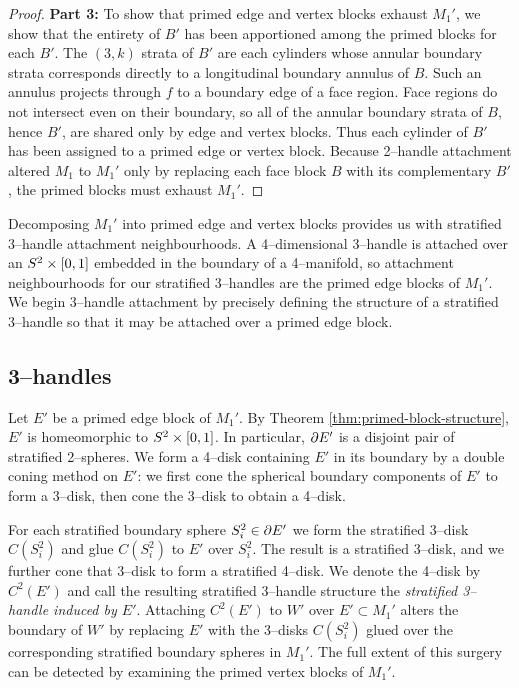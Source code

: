 \begin{proof}
	\textbf{Part 3:}
	To show that primed edge and vertex blocks exhaust $M_1'$, we show that the entirety of $B'$ has been apportioned among the primed blocks for each $B'$.
	The $(3,k)$ strata of $B'$ are each cylinders whose annular boundary strata corresponds directly to a longitudinal boundary annulus of $B$.
	Such an annulus projects through $f$ to a boundary edge of a face region.
	Face regions do not intersect even on their boundary, so all of the annular boundary strata of $B$, hence $B'$, are shared only by edge and vertex blocks.
	Thus each cylinder of $B'$ has been assigned to a primed edge or vertex block.
	Because 2--handle attachment altered $M_1$ to $M_1'$ only by replacing each face block $B$ with its complementary $B'$, the primed blocks must exhaust $M_1'$.
\end{proof}

Decomposing $M_1'$ into primed edge and vertex blocks provides us with stratified 3--handle attachment neighbourhoods.
A 4--dimensional 3--handle is attached over an $S^2\times[0,1]$ embedded in the boundary of a 4--manifold, so attachment neighbourhoods for our stratified 3--handles are the primed edge blocks of $M_1'$.
We begin 3--handle attachment by precisely defining the structure of a stratified 3--handle so that it may be attached over a primed edge block.

\subsection{3--handles}

Let $E'$ be a primed edge block of $M_1'$.
By Theorem \ref{thm:primed-block-structure}, $E'$ is homeomorphic to $S^2\times[0,1]$.
In particular, $\partial E'$ is a disjoint pair of stratified 2--spheres.
We form a 4--disk containing $E'$ in its boundary by a double coning method on $E'$: we first cone the spherical boundary components of $E'$ to form a 3--disk, then cone the 3--disk to obtain a 4--disk.


For each stratified boundary sphere $S_i^2\in\partial E'$ we form the stratified 3--disk $C(S_i^2)$ and glue $C(S_i^2)$ to $E'$ over $S_i^2$.
The result is a stratified 3--disk, and we further cone that 3--disk to form a stratified 4--disk.
We denote the 4--disk by $C^2(E')$ and call the resulting stratified 3--handle structure the \emph{stratified 3--handle induced by $E'$}.
Attaching $C^2(E')$ to $W'$ over $E'\subset M_1'$ alters the boundary of $W'$ by replacing $E'$ with the 3--disks $C(S_i^2)$ glued over the corresponding stratified boundary spheres in $M_1'$.
The full extent of this surgery can be detected by examining the primed vertex blocks of $M_1'$.

